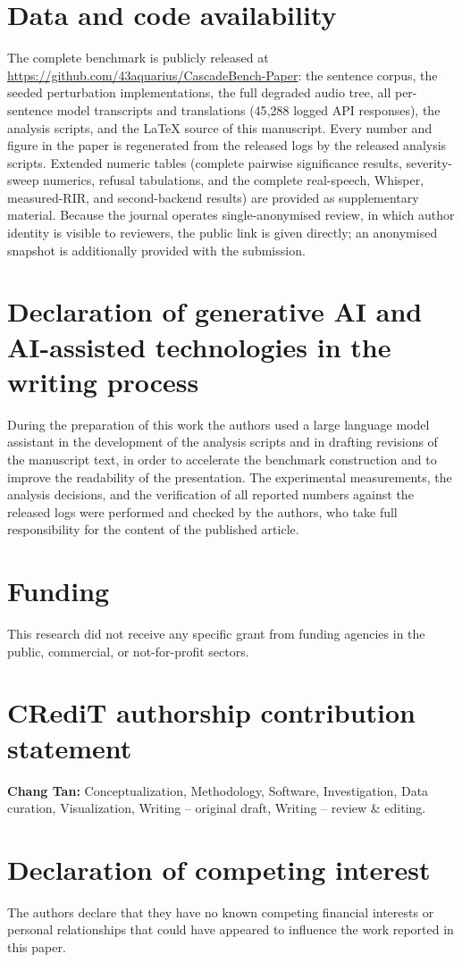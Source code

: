 \documentclass[review,authoryear,sort&compress]{elsarticle}
\begin{document}








\section*{Data and code availability}
The complete benchmark is publicly released at
\url{https://github.com/43aquarius/CascadeBench-Paper}:
the sentence corpus, the seeded perturbation implementations, the full
degraded audio tree, all per-sentence model transcripts and translations
(45{,}288 logged API responses), the analysis scripts, and the LaTeX source
of this manuscript. Every number and figure in the paper is regenerated
from the released logs by the released analysis scripts. Extended numeric
tables (complete pairwise significance results, severity-sweep numerics,
refusal tabulations, and the complete real-speech, Whisper, measured-RIR,
and second-backend results) are provided as supplementary material.
Because the
journal operates single-anonymised review, in which author identity is
visible to reviewers, the public link is given directly; an anonymised
snapshot is additionally provided with the submission.

\section*{Declaration of generative AI and AI-assisted technologies in the
writing process}
During the preparation of this work the authors used a large language model
assistant in the development of the analysis scripts and in drafting
revisions of the manuscript text, in order to accelerate the benchmark
construction and to improve the readability of the presentation. The
experimental measurements, the analysis decisions, and the verification of
all reported numbers against the released logs were performed and checked by
the authors, who take full responsibility for the content of the published
article.

\section*{Funding}
This research did not receive any specific grant from funding agencies in
the public, commercial, or not-for-profit sectors.

\section*{CRediT authorship contribution statement}
\textbf{Chang Tan:} Conceptualization, Methodology, Software, Investigation,
Data curation, Visualization, Writing -- original draft, Writing -- review \&
editing.

\section*{Declaration of competing interest}
The authors declare that they have no known competing financial interests or
personal relationships that could have appeared to influence the work reported
in this paper.



\end{document}
